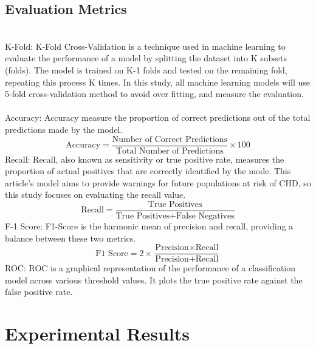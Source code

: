 \documentclass[11pt]{article}
\begin{document}
\subsection{Evaluation Metrics}\\
\text 
K-Fold: K-Fold Cross-Validation is a technique used in machine learning to evaluate the performance of a model by splitting the dataset into K subsets (folds). The model is trained on K-1 folds and tested on the remaining fold, repeating this process K times. In this study, all machine learning models will use 5-fold cross-validation method to avoid over fitting, and measure the evaluation.  \\\\
Accuracy: Accuracy measure the proportion of correct predictions out of the total predictions made by the model. \\
\[
    \text{Accuracy} = \frac{\text{Number of Correct Predictions}}{\text{Total Number of Predictions}} \times 100
\]
Recall: Recall, also known as sensitivity or true positive rate, measures the proportion of actual positives that are correctly identified by the mode. This article's model aims to provide warnings for future populations at risk of CHD, so this study focuses on evaluating the recall value.\\
\[
    \text{Recall} = \frac{\text{True Positives}}{\text{True Positives} + \text{False Negatives}}
\]
F-1 Score: F1-Score is the harmonic mean of precision and recall, providing a balance between these two metrics. \\
\[
\text{F1 Score} = 2 \times \frac{\text{Precision} \times \text{Recall}}{\text{Precision} + \text{Recall}}
\]
ROC: ROC is a graphical representation of the performance of a classification model across various threshold values. It plots the true positive rate against the false positive rate. 
\section{Experimental Results}
\end{document}
